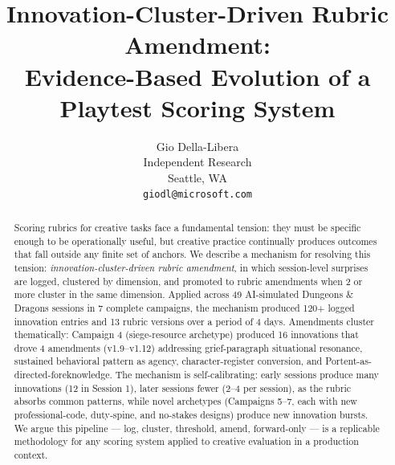 \documentclass{article}
\begin{document}
\title{Innovation-Cluster-Driven Rubric Amendment:\\
       Evidence-Based Evolution of a Playtest Scoring System}

\author{
  Gio Della-Libera \\
  Independent Research \\
  Seattle, WA \\
  \texttt{giodl@microsoft.com}
}

\maketitle

\begin{abstract}
Scoring rubrics for creative tasks face a fundamental tension: they must be
specific enough to be operationally useful, but creative practice continually
produces outcomes that fall outside any finite set of anchors. We describe a
mechanism for resolving this tension: \textit{innovation-cluster-driven rubric
amendment}, in which session-level surprises are logged, clustered by dimension,
and promoted to rubric amendments when 2 or more cluster in the same dimension.
Applied across 49 AI-simulated Dungeons \& Dragons sessions in 7 complete
campaigns, the mechanism produced 120+ logged innovation entries and 13 rubric
versions over a period of 4 days. Amendments cluster thematically: Campaign 4
(siege-resource archetype) produced 16 innovations that drove 4 amendments
(v1.9--v1.12) addressing grief-paragraph situational resonance, sustained
behavioral pattern as agency, character-register conversion, and
Portent-as-directed-foreknowledge. The mechanism is self-calibrating:
early sessions produce many innovations (12 in Session 1), later sessions fewer
(2--4 per session), as the rubric absorbs common patterns, while novel archetypes
(Campaigns 5--7, each with new professional-code, duty-spine, and no-stakes
designs) produce new innovation bursts. We argue this pipeline --- log,
cluster, threshold, amend, forward-only --- is a replicable methodology for any
scoring system applied to creative evaluation in a production context.
\end{abstract}










\end{document}
